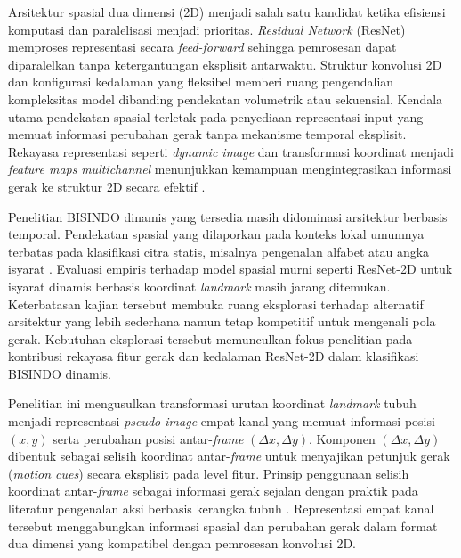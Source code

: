 Arsitektur spasial dua dimensi (2D) menjadi salah satu kandidat ketika efisiensi komputasi dan paralelisasi menjadi prioritas.
\textit{Residual Network} (ResNet) memproses representasi secara \textit{feed-forward} sehingga pemrosesan dapat diparalelkan tanpa ketergantungan eksplisit antarwaktu.
Struktur konvolusi 2D dan konfigurasi kedalaman yang fleksibel memberi ruang pengendalian kompleksitas model dibanding pendekatan volumetrik atau sekuensial.
Kendala utama pendekatan spasial terletak pada penyediaan representasi input yang memuat informasi perubahan gerak tanpa mekanisme temporal eksplisit.
Rekayasa representasi seperti \textit{dynamic image} dan transformasi koordinat menjadi \textit{feature maps} \textit{multichannel} menunjukkan kemampuan mengintegrasikan informasi gerak ke struktur 2D secara efektif \cite{bilen2017dynamicimage,zhu2023f2dcnet}.

Penelitian BISINDO dinamis yang tersedia masih didominasi arsitektur berbasis temporal.
Pendekatan spasial yang dilaporkan pada konteks lokal umumnya terbatas pada klasifikasi citra statis, misalnya pengenalan alfabet atau angka isyarat \cite{sholawati2022sibi,saputra2024bisindocnn}.
Evaluasi empiris terhadap model spasial murni seperti ResNet-2D untuk isyarat dinamis berbasis koordinat \textit{landmark} masih jarang ditemukan.
Keterbatasan kajian tersebut membuka ruang eksplorasi terhadap alternatif arsitektur yang lebih sederhana namun tetap kompetitif untuk mengenali pola gerak.
Kebutuhan eksplorasi tersebut memunculkan fokus penelitian pada kontribusi rekayasa fitur gerak dan kedalaman ResNet-2D dalam klasifikasi BISINDO dinamis.

Penelitian ini mengusulkan transformasi urutan koordinat \textit{landmark} tubuh menjadi representasi \textit{pseudo-image} empat kanal yang memuat informasi posisi $(x,y)$ serta perubahan posisi antar-\textit{frame} $(\Delta x, \Delta y)$.
Komponen $(\Delta x, \Delta y)$ dibentuk sebagai selisih koordinat antar-\textit{frame} untuk menyajikan petunjuk gerak (\textit{motion cues}) secara eksplisit pada level fitur.
Prinsip penggunaan selisih koordinat antar-\textit{frame} sebagai informasi gerak sejalan dengan praktik pada literatur pengenalan aksi berbasis kerangka tubuh \cite{shi2019skeletonaction}.
Representasi empat kanal tersebut menggabungkan informasi spasial dan perubahan gerak dalam format dua dimensi yang kompatibel dengan pemrosesan konvolusi 2D.

